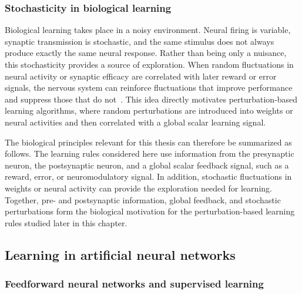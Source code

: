 \subsubsection{Stochasticity in biological learning}

Biological learning takes place in a noisy environment. Neural firing is variable, synaptic transmission is stochastic, and the same stimulus does not always produce exactly the same neural response. Rather than being only a nuisance, this stochasticity provides a source of exploration. When random fluctuations in neural activity or synaptic efficacy are correlated with later reward or error signals, the nervous system can reinforce fluctuations that improve performance and suppress those that do not~\parencite{seung_learning_2003}. This idea directly motivates perturbation-based learning algorithms, where random perturbations are introduced into weights or neural activities and then correlated with a global scalar learning signal.

The biological principles relevant for this thesis can therefore be summarized as follows. The learning rules considered here use information from the presynaptic neuron, the postsynaptic neuron, and a global scalar feedback signal, such as a reward, error, or neuromodulatory signal. In addition, stochastic fluctuations in weights or neural activity can provide the exploration needed for learning. Together, pre- and postsynaptic information, global feedback, and stochastic perturbations form the biological motivation for the perturbation-based learning rules studied later in this chapter.
\subsection{Learning in artificial neural networks}

\subsubsection{Feedforward neural networks and supervised learning}

